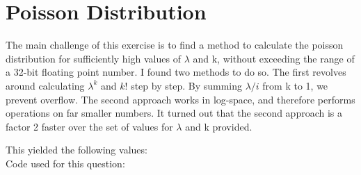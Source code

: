 \section{Poisson Distribution}

The main challenge of this exercise is to find a method to calculate the 
poisson distribution for sufficiently high values of $\lambda$ and k, without 
exceeding the range of a 32-bit floating point number.
I found two methods to do so. The first revolves around calculating $\lambda^k$ and $k!$ step by step.
By summing $\lambda/i$ from k to 1, we prevent overflow. 
The second approach works in log-space, and therefore performs operations on far smaller numbers.
It turned out that the second approach is a factor 2 faster over the set of
values for $\lambda$ and k provided.



\noindent
This yielded the following values:\\


\noindent
Code used for this question:



